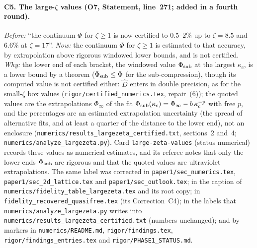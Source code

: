 \documentclass[11pt]{article}
\theoremstyle{accent}
\theoremstyle{definition}
\begin{document}
{\paragraph{C5. The large-\(\zeta\) values (O7, Statement, line~271; added in a fourth round).}
\emph{Before:} ``the continuum \(\Phi\) for \(\zeta\ge1\) is now certified to \(0.5\)--\(2\%\) up to
\(\zeta=8.5\) and \(6.6\%\) at \(\zeta=17\)''.
\emph{Now:} the continuum \(\Phi\) for \(\zeta\ge1\) is estimated to that accuracy, by extrapolation
above rigorous windowed lower bounds, and is not certified.
\emph{Why:} the lower end of each bracket, the windowed value \(\Phi_{\rm sub}\) at the largest \(\kappa_c\), is a lower bound by a theorem (\(\Phi_{\rm sub}\le\Phi\) for the sub-compression), though its computed value is not certified either: \(\widehat D\) enters in double precision, as for the small-\(\zeta\) box values (\texttt{rigor/certified\_numerics.tex}, repair~(6)); the quoted values are the extrapolations
\(\Phi_\infty\) of the fit \(\Phi_{\rm sub}(\kappa_c)=\Phi_\infty-b\,\kappa_c^{-p}\) with free \(p\), and the
percentages are an estimated extrapolation uncertainty (the spread of alternative fits, and at least a
quarter of the distance to the lower end), not an enclosure (\texttt{numerics/results\_largezeta\_certified.txt},
sections~2 and~4; \texttt{numerics/analyze\_largezeta.py}).  Card \texttt{large-zeta-values} (status
numerical) records these values as numerical estimates, and its referee notes that only the lower ends
\(\Phi_{\rm sub}\) are rigorous and that the quoted values are ultraviolet extrapolations.  The same label
was corrected in \texttt{paper1/sec\_numerics.tex}, \texttt{paper1/sec\_2d\_lattice.tex} and
\texttt{paper1/sec\_outlook.tex}; in the caption of \texttt{numerics/fidelity\_table\_largezeta.tex} and its
root copy; in \texttt{fidelity\_recovered\_quasifree.tex} (its Correction~C4); in the labels that
\texttt{numerics/analyze\_largezeta.py} writes into \texttt{numerics/results\_largezeta\_certified.txt}
(numbers unchanged); and by markers in \texttt{numerics/README.md}, \texttt{rigor/findings.tex},
\texttt{rigor/findings\_entries.tex} and \texttt{rigor/PHASE1\_STATUS.md}.
}
\end{document}
